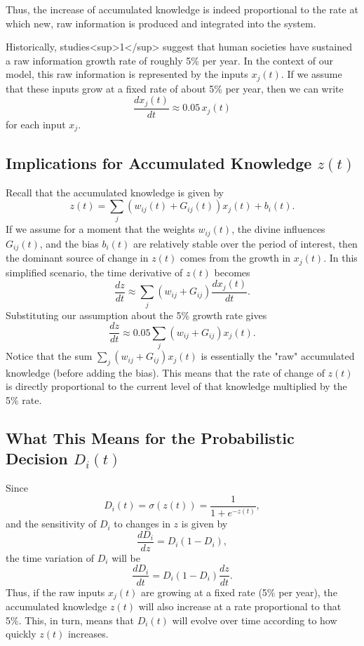 \documentclass{article}
\newcommand{\bn}{\bigskip\noindent}
\begin{document}
\bn
Thus, the increase of accumulated knowledge is indeed proportional to the rate at which new, raw information is produced and integrated into the system.

\bn
Historically, studies<sup>1</sup> suggest that human societies have sustained a raw information growth rate of roughly 
5\% per year. In the context of our model, this raw information is represented by the inputs $x_j(t)$. If we assume that these inputs grow at a fixed rate of about 5\% per year, then we can write
$$
\frac{dx_j(t)}{dt} \approx 0.05\, x_j(t)
$$
for each input $x_j$.

\subsection*{Implications for Accumulated Knowledge $z(t)$}

Recall that the accumulated knowledge is given by
$$
z(t) = \sum_j \left(w_{ij}(t) + G_{ij}(t)\right)x_j(t) + b_i(t).
$$
If we assume for a moment that the weights $w_{ij}(t)$, the divine influences $G_{ij}(t)$, and the bias $b_i(t)$ are relatively stable over the period of interest, then the dominant source of change in $z(t)$ comes from the growth in $x_j(t)$. In this simplified scenario, the time derivative of $z(t)$ becomes
$$
\frac{dz}{dt} \approx \sum_j \left(w_{ij} + G_{ij}\right) \frac{dx_j(t)}{dt}.
$$
Substituting our assumption about the 5\% growth rate gives
$$
\frac{dz}{dt} \approx 0.05 \sum_j \left(w_{ij} + G_{ij}\right)x_j(t).
$$
Notice that the sum $\sum_j \left(w_{ij} + G_{ij}\right)x_j(t)$ is essentially the "raw" accumulated knowledge (before adding the bias). This means that the rate of change of $z(t)$ is directly proportional to the current level of that knowledge multiplied by the 5\% rate.

\subsection*{What This Means for the Probabilistic Decision $D_i(t)$}

Since
$$
D_i(t) = \sigma(z(t)) = \frac{1}{1+e^{-z(t)}},
$$
and the sensitivity of $D_i$ to changes in $z$ is given by
$$
\frac{dD_i}{dz} = D_i(1-D_i),
$$
the time variation of $D_i$ will be
$$
\frac{dD_i}{dt} = D_i(1-D_i) \frac{dz}{dt}.
$$
Thus, if the raw inputs $x_j(t)$ are growing at a fixed rate (5\% per year), the accumulated knowledge $z(t)$ will also increase at a rate proportional to that 5\%. This, in turn, means that $D_i(t)$ will evolve over time according to how quickly $z(t)$ increases.
\end{document}
